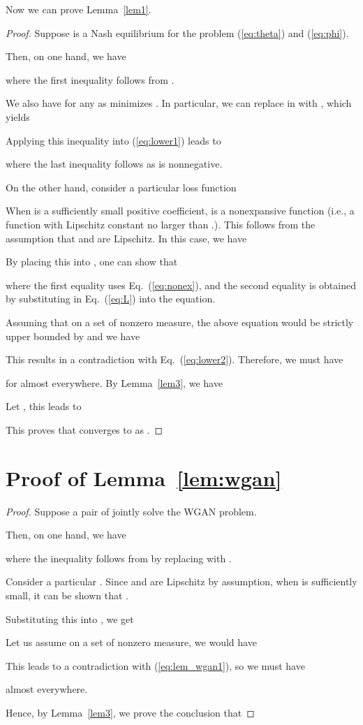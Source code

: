 \documentclass[11pt,fullpage, letterpaper,twoside]{article}
\newcommand{\1}[1]{\mathds{1}_{\left[#1\right]}}
\begin{document}
Now we can prove Lemma~\ref{lem1}.
\begin{proof}
Suppose  is a Nash equilibrium for the problem (\ref{eq:theta}) and (\ref{eq:phi}).

Then, on one hand, we have

where the first inequality follows from .

We also have  for any  as  minimizes . In particular, we can replace  in  with , which yields


Applying this inequality into (\ref{eq:lower1}) leads to

where the last inequality follows as  is nonnegative.





On the other hand, consider a particular loss function

When  is a sufficiently small positive coefficient,  is a nonexpansive function (i.e., a function with Lipschitz constant no larger than .). This follows from the assumption that   and  are Lipschitz.  In this case, we have


By placing this  into , one can show that

where the first equality uses Eq.~(\ref{eq:nonex}), and the second equality is obtained by substituting   in Eq.~(\ref{eq:L}) into the equation.


Assuming that  on a set of nonzero measure, the above equation would be strictly upper bounded by  and we have


This results in a contradiction with Eq.~(\ref{eq:lower2}).
Therefore, we must have

for almost everywhere.  By Lemma~\ref{lem3}, we have


Let , this leads to

This proves that  converges to  as .
\end{proof}

\section{Proof of Lemma~\ref{lem:wgan}}\label{appendixC}
\begin{proof}
Suppose a pair of  jointly solve the WGAN problem.

Then, on one hand, we have

where the inequality follows from  by replacing  with .

Consider a particular .  Since  and  are Lipschitz by assumption, when  is sufficiently small, it can be shown that .

Substituting this  into , we get


Let us assume  on a set of nonzero measure, we would have

This leads to a contradiction with (\ref{eq:lem_wgan1}), so we must have

almost everywhere.

Hence, by Lemma~\ref{lem3}, we prove the conclusion that

\end{proof}
\end{document}
